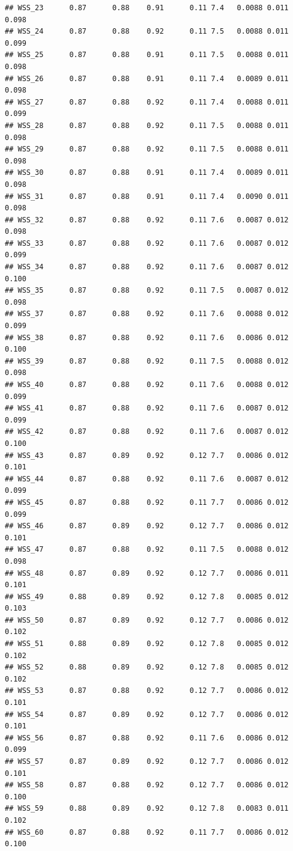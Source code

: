 \documentclass[
]{article}
\begin{document}
\begin{verbatim}
## WSS_23      0.87      0.88    0.91      0.11 7.4   0.0088 0.011 0.098
## WSS_24      0.87      0.88    0.92      0.11 7.5   0.0088 0.011 0.099
## WSS_25      0.87      0.88    0.91      0.11 7.5   0.0088 0.011 0.098
## WSS_26      0.87      0.88    0.91      0.11 7.4   0.0089 0.011 0.098
## WSS_27      0.87      0.88    0.92      0.11 7.4   0.0088 0.011 0.099
## WSS_28      0.87      0.88    0.92      0.11 7.5   0.0088 0.011 0.098
## WSS_29      0.87      0.88    0.92      0.11 7.5   0.0088 0.011 0.098
## WSS_30      0.87      0.88    0.91      0.11 7.4   0.0089 0.011 0.098
## WSS_31      0.87      0.88    0.91      0.11 7.4   0.0090 0.011 0.098
## WSS_32      0.87      0.88    0.92      0.11 7.6   0.0087 0.012 0.098
## WSS_33      0.87      0.88    0.92      0.11 7.6   0.0087 0.012 0.099
## WSS_34      0.87      0.88    0.92      0.11 7.6   0.0087 0.012 0.100
## WSS_35      0.87      0.88    0.92      0.11 7.5   0.0087 0.012 0.098
## WSS_37      0.87      0.88    0.92      0.11 7.6   0.0088 0.012 0.099
## WSS_38      0.87      0.88    0.92      0.11 7.6   0.0086 0.012 0.100
## WSS_39      0.87      0.88    0.92      0.11 7.5   0.0088 0.012 0.098
## WSS_40      0.87      0.88    0.92      0.11 7.6   0.0088 0.012 0.099
## WSS_41      0.87      0.88    0.92      0.11 7.6   0.0087 0.012 0.099
## WSS_42      0.87      0.88    0.92      0.11 7.6   0.0087 0.012 0.100
## WSS_43      0.87      0.89    0.92      0.12 7.7   0.0086 0.012 0.101
## WSS_44      0.87      0.88    0.92      0.11 7.6   0.0087 0.012 0.099
## WSS_45      0.87      0.88    0.92      0.11 7.7   0.0086 0.012 0.099
## WSS_46      0.87      0.89    0.92      0.12 7.7   0.0086 0.012 0.101
## WSS_47      0.87      0.88    0.92      0.11 7.5   0.0088 0.012 0.098
## WSS_48      0.87      0.89    0.92      0.12 7.7   0.0086 0.011 0.101
## WSS_49      0.88      0.89    0.92      0.12 7.8   0.0085 0.012 0.103
## WSS_50      0.87      0.89    0.92      0.12 7.7   0.0086 0.012 0.102
## WSS_51      0.88      0.89    0.92      0.12 7.8   0.0085 0.012 0.102
## WSS_52      0.88      0.89    0.92      0.12 7.8   0.0085 0.012 0.102
## WSS_53      0.87      0.88    0.92      0.12 7.7   0.0086 0.012 0.101
## WSS_54      0.87      0.89    0.92      0.12 7.7   0.0086 0.012 0.101
## WSS_56      0.87      0.88    0.92      0.11 7.6   0.0086 0.012 0.099
## WSS_57      0.87      0.89    0.92      0.12 7.7   0.0086 0.012 0.101
## WSS_58      0.87      0.88    0.92      0.12 7.7   0.0086 0.012 0.100
## WSS_59      0.88      0.89    0.92      0.12 7.8   0.0083 0.011 0.102
## WSS_60      0.87      0.88    0.92      0.11 7.7   0.0086 0.012 0.100

\end{verbatim}
\end{document}
